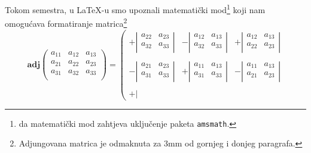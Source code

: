 \documentclass{article}
\begin{document}
Tokom semestra, u \LaTeX{}-u smo upoznali matematički mod\footnote{{} da matematički mod zahtjeva uključenje paketa \texttt{amsmath}.} koji nam omogućava formatiranje matrica\footnote{Adjungovana matrica je odmaknuta za 3mm od gornjeg i donjeg paragrafa.}\\
\vspace{3mm}
\begin{displaymath}
\textbf{adj}
\left(
\begin{matrix}
a_{11} & a_{12} & a_{13} \\
a_{21} & a_{22} & a_{23} \\
a_{31} & a_{32} & a_{33} \\
\end{matrix}
\right)
=
\left(
\begin{matrix}
 +
 \left|
 \begin{matrix}
  a_{22} & a_{23} \\
  a_{32} & a_{33} \\
 \end{matrix}
 \right| 
 &
 -
 \left|
 \begin{matrix}
  a_{12} & a_{13} \\
  a_{32} & a_{33} \\
 \end{matrix}
 \right|
 &
 +
 \left|
 \begin{matrix}
  a_{12} & a_{13} \\
  a_{22} & a_{23} \\
 \end{matrix}
 \right|
 \\ \\
 -
 \left|
 \begin{matrix}
  a_{21} & a_{23} \\
  a_{31} & a_{33} \\
 \end{matrix}
 \right|
 &
 +
 \left|
 \begin{matrix}
  a_{11} & a_{13} \\
  a_{31} & a_{33} \\
 \end{matrix}
 \right|
 &
 -
 \left|
 \begin{matrix}
  a_{11} & a_{13} \\
  a_{21} & a_{23} \\
 \end{matrix}
 \right|
 \\ \\
 +
 \left|
 \begin{matrix}

\end{matrix}
\end{matrix}
\end{displaymath}
\end{document}
